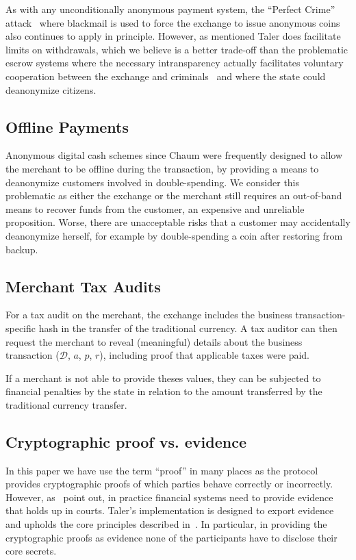 \documentclass[sigconf, authordraft]{acmart}
\begin{document}
As with any unconditionally anonymous payment system, the ``Perfect
Crime'' attack~\cite{solms1992perfect} where blackmail is used to
force the exchange to issue anonymous coins also continues to apply in
principle.  However, as mentioned Taler does facilitate limits on
withdrawals, which we believe is a better trade-off than the
problematic escrow systems where the necessary intransparency
actually facilitates voluntary cooperation between the exchange and
criminals~\cite{sander1999escrow} and where the state could
deanonymize citizens.

\subsection{Offline Payments} \label{sec:offline}

Anonymous digital cash schemes since Chaum were frequently designed
to allow the merchant to be offline during the transaction,
by providing a means to deanonymize customers involved in
double-spending.  We consider this problematic as either the
exchange or the merchant still requires an out-of-band
means to recover funds from the customer, an expensive and
unreliable proposition.  Worse, there are unacceptable risks that
a customer may accidentally deanonymize herself, for example by
double-spending a coin after restoring from backup.

\subsection{Merchant Tax Audits}

For a tax audit on the merchant, the exchange includes the business
transaction-specific hash in the transfer of the traditional
currency.  A tax auditor can then request the merchant to reveal
(meaningful) details about the business transaction ($\mathcal{D}$,
$a$, $p$, $r$), including proof that applicable taxes were paid.

If a merchant is not able to provide theses values, they can be
subjected to financial penalties by the state in relation to the
amount transferred by the traditional currency transfer.

\subsection{Cryptographic proof vs. evidence}

In this paper we have use the term ``proof'' in many places as the
protocol provides cryptographic proofs of which parties behave
correctly or incorrectly. However, as~\cite{fc2014murdoch} point out,
in practice financial systems need to provide evidence that holds up
in courts.  Taler's implementation is designed to export evidence and
upholds the core principles described in~\cite{fc2014murdoch}.  In
particular, in providing the cryptographic proofs as evidence none of
the participants have to disclose their core secrets.
\end{document}
